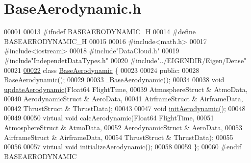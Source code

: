 \hypertarget{_base_aerodynamic_8h_source}{}\section{Base\+Aerodynamic.\+h}
\label{_base_aerodynamic_8h_source}

\begin{DoxyCode}
00001 
00013 \textcolor{preprocessor}{#ifndef BASEAERODYNAMIC\_H}
00014 \textcolor{preprocessor}{#define BASEAERODYNAMIC\_H}
00015 
00016 \textcolor{preprocessor}{#include<math.h>}
00017 \textcolor{preprocessor}{#include<iostream>}
00018 \textcolor{preprocessor}{#include"DataCloud.h"}
00019 \textcolor{preprocessor}{#include"IndependetDataTypes.h"}
00020 \textcolor{preprocessor}{#include"../EIGENDIR/Eigen/Dense"}
00021 
\hyperlink{group___aerodynamic}{00022} \textcolor{keyword}{class }\hyperlink{group___aerodynamic_class_base_aerodynamic}{BaseAerodynamic} \{
00023 
00024 \textcolor{keyword}{public}:
00028     \hyperlink{group___aerodynamic_aa05d0598119b1364cdb45cf478ae578c}{BaseAerodynamic}();
00029 
00033     \hyperlink{group___aerodynamic_a81d08f3a779e6e25245b6f3b545920cb}{~BaseAerodynamic}();
00034 
00038     \textcolor{keywordtype}{void} \hyperlink{group___aerodynamic_a6354f3c8433c7a2235041f843d4fe10e}{updateAerodynamic}(Float64 FlightTime,
00039                             AtmosphereStruct & AtmoData,
00040                             AerodynamicStruct & AeroData,
00041                             AirframeStruct & AirframeData,
00042                             ThrustStruct & ThrustData);
00043 
00047     \textcolor{keywordtype}{void} \hyperlink{group___aerodynamic_aaeebe11ae40e87069a13256d1de4f1bb}{initAerodynamic}();
00048 
00049 
00050     \textcolor{keyword}{virtual} \textcolor{keywordtype}{void} calcAerodynamic(Float64 FlightTime,
00051                                 AtmosphereStruct & AtmoData,
00052                                 AerodynamicStruct & AeroData,
00053                                 AirframeStruct & AirframeData,
00054                                 ThrustStruct & ThrustData);
00055 
00056 
00057     \textcolor{keyword}{virtual} \textcolor{keywordtype}{void} initializeAerodynamic();
00058 
00059 \};
00060 \textcolor{preprocessor}{#endif BASEAERODYNAMIC}
\end{DoxyCode}

